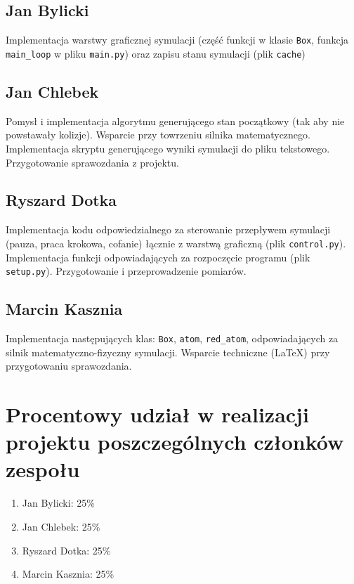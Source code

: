 \documentclass{article}
\begin{document}
    \subsection{Jan Bylicki}
        Implementacja warstwy graficznej symulacji (część funkcji w klasie \verb+Box+, funkcja \verb+main_loop+ w pliku \verb+main.py+) oraz zapisu stanu symulacji (plik \verb+cache+)
    \subsection{Jan Chlebek}
        Pomysł i implementacja algorytmu generującego stan początkowy (tak aby nie powstawały kolizje). Wsparcie przy towrzeniu silnika matematycznego. Implementacja skryptu generującego wyniki symulacji do pliku tekstowego. Przygotowanie sprawozdania z projektu.
    \subsection{Ryszard Dotka}
        Implementacja kodu odpowiedzialnego za sterowanie przepływem symulacji (pauza, praca krokowa, cofanie) łącznie z warstwą graficzną (plik \verb+control.py+). Implementacja funkcji odpowiadających za rozpoczęcie programu (plik \verb+setup.py+). Przygotowanie i przeprowadzenie pomiarów.
    \subsection{Marcin Kasznia}
        Implementacja następujących klas: \verb+Box+, \verb+atom+, \verb+red_atom+, odpowiadających za silnik matematyczno-fizyczny symulacji. Wsparcie techniczne (\LaTeX) przy przygotowaniu sprawozdania.

\section{Procentowy udział w realizacji projektu poszczególnych członków zespołu}
\begin{enumerate}
    \item Jan Bylicki: 25\%
    \item Jan Chlebek: 25\%
    \item Ryszard Dotka: 25\%
    \item Marcin Kasznia: 25\%
\end{enumerate}
\end{document}

